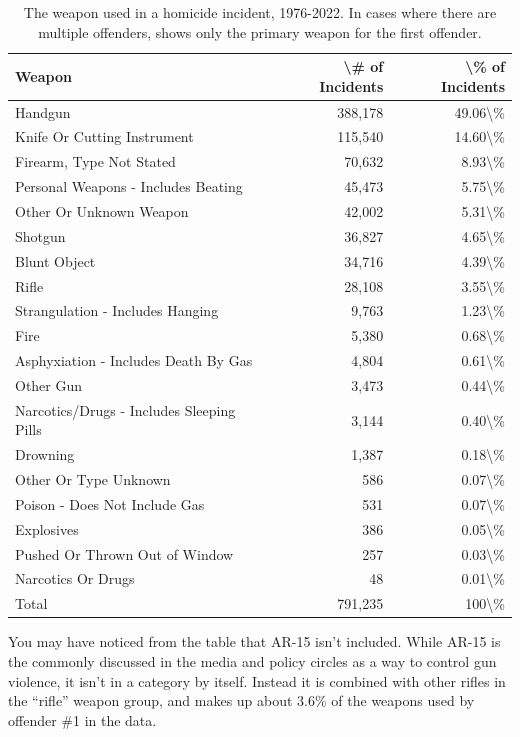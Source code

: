 \documentclass[
  12pt,
  openany]{book}
\begin{document}
\begin{longtable}[t]{lrr}
\caption{\label{tab:shrWeapon}The weapon used in a homicide incident, 1976-2022. In cases where there are multiple offenders, shows only the primary weapon for the first offender.}\\
\toprule
Weapon & \textbackslash{}\# of Incidents & \textbackslash{}\% of Incidents\\
\midrule
Handgun & 388,178 & 49.06\textbackslash{}\%\\
Knife Or Cutting Instrument & 115,540 & 14.60\textbackslash{}\%\\
Firearm, Type Not Stated & 70,632 & 8.93\textbackslash{}\%\\
Personal Weapons - Includes Beating & 45,473 & 5.75\textbackslash{}\%\\
Other Or Unknown Weapon & 42,002 & 5.31\textbackslash{}\%\\
\addlinespace
Shotgun & 36,827 & 4.65\textbackslash{}\%\\
Blunt Object & 34,716 & 4.39\textbackslash{}\%\\
Rifle & 28,108 & 3.55\textbackslash{}\%\\
Strangulation - Includes Hanging & 9,763 & 1.23\textbackslash{}\%\\
Fire & 5,380 & 0.68\textbackslash{}\%\\
\addlinespace
Asphyxiation - Includes Death By Gas & 4,804 & 0.61\textbackslash{}\%\\
Other Gun & 3,473 & 0.44\textbackslash{}\%\\
Narcotics/Drugs - Includes Sleeping Pills & 3,144 & 0.40\textbackslash{}\%\\
Drowning & 1,387 & 0.18\textbackslash{}\%\\
Other Or Type Unknown & 586 & 0.07\textbackslash{}\%\\
\addlinespace
Poison - Does Not Include Gas & 531 & 0.07\textbackslash{}\%\\
Explosives & 386 & 0.05\textbackslash{}\%\\
Pushed Or Thrown Out of Window & 257 & 0.03\textbackslash{}\%\\
Narcotics Or Drugs & 48 & 0.01\textbackslash{}\%\\
Total & 791,235 & 100\textbackslash{}\%\\
\bottomrule
\end{longtable}

You may have noticed from the table that AR-15 isn't included. While AR-15 is the commonly discussed in the media and policy circles as a way to control gun violence, it isn't in a category by itself. Instead it is combined with other rifles in the ``rifle'' weapon group, and makes up about 3.6\% of the weapons used by offender \#1 in the data.
\end{document}
